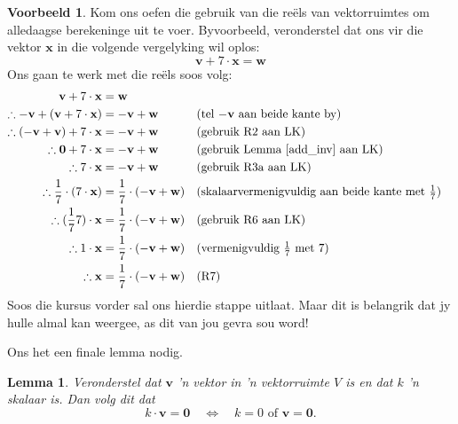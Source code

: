 \documentclass[a4paper,11pt]{book}
\newtheorem{lemma}[theorem]{Lemma}
\theoremstyle{definition}
\newtheorem{example_environment}{Voorbeeld}[chapter]
\newcommand{\be}{\begin{equation}}
\newcommand{\ee}{\end{equation}}
\newcommand{\ve}[1]{\mathbf{#1}}
\newenvironment{example}
	{
		\begin{oframed}
		\begin{example_environment}
	}
	{
		\end{example_environment}
		\end{oframed}
	}
\begin{document}
\begin{example} \label{explicit_solve_x} Kom ons oefen die gebruik van
	die re{\"e}ls van vektorruimtes om alledaagse berekeninge uit te voer.
	Byvoorbeeld, veronderstel dat ons vir die vektor $\ve{x}$ in die
	volgende vergelyking wil oplos:
	\be
	\ve{v} + 7 \cdot \ve{x} = \ve{w}
	\ee
	Ons gaan te werk met die re{\"e}ls soos volg:
	\begin{align*}
		\ve{v} + 7 \cdot \ve{x} & = \ve{w} \\
		\therefore  -\ve{v} + (\ve{v} + 7 \cdot \ve{x}) & = -\ve{v} +
		\ve{w} && \mbox{(tel $-\ve{v}$ aan beide kante by)} \\
		\therefore  (-\ve{v} + \ve{v}) + 7 \cdot \ve{x} & = -\ve{v} +
		\ve{w} && \mbox{(gebruik R2 aan LK)} \\
		\therefore  \ve{0} + 7 \cdot \ve{x} & = -\ve{v} + \ve{w} &&
		\mbox{(gebruik Lemma \ref{add_inv} aan LK)} \\
		\therefore  7 \cdot \ve{x} & =  -\ve{v} + \ve{w} && \mbox{(gebruik
		R3a aan LK)} \\
		\therefore  \frac{1}{7} \cdot (7 \cdot \ve{x}) & = \frac{1}{7}
		\cdot (-\ve{v} + \ve{w}) && \mbox{(skalaarvermenigvuldig aan beide
		kante met $\frac{1}{7}$)} \\
		\therefore  (\frac{1}{7} 7) \cdot 	\ve{x} & = \frac{1}{7} \cdot
		(-\ve{v} + \ve{w}) && \mbox{(gebruik R6 aan LK)} \\
		\therefore  1 \cdot \ve{x} & =  \frac{1}{7} \cdot (-\ve{v} +
		\ve{w})  && \mbox{(vermenigvuldig $\frac{1}{7}$ met $7$)} \\
		\therefore  \ve{x} & =  \frac{1}{7} \cdot (-\ve{v} + \ve{w}) &&
		\mbox{(R7)}
	\end{align*}
	Soos die kursus vorder sal ons hierdie stappe uitlaat.  Maar dit is
	belangrik dat jy hulle almal kan weergee, as dit van jou gevra sou
	word!
\end{example}
Ons het een finale lemma nodig.
\begin{lemma} \label{dichotomy_lem} Veronderstel dat $\ve{v}$ 'n vektor in
	'n vektorruimte $V$ is en dat $k$ 'n skalaar is. Dan volg dit dat
	\[
		k \cdot \ve{v} = \ve{0} \quad \Leftrightarrow \quad k = 0 \mbox{ of
		} \ve{v} = \ve{0}.
	\]
\end{lemma}
\end{document}
